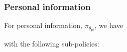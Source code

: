 \documentclass[a4paper]{article}
\begin{document}
\begin{center}
\noindent{}
\end{center} 

\subsubsection{Personal information} 

For personal information, $\pi_{\theta_{pi}}$, we have  

\begin{center}
\noindent{}
\end{center}  

with the following sub-policies: 
\end{document}
